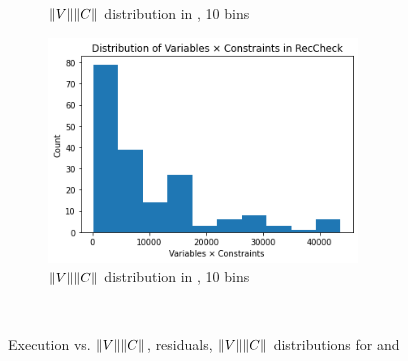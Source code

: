 \begin{figure}
\begin{subfigure}{0.475\textwidth}
\caption{$\lVert V\rVert\lVert C\rVert$ distribution in \solve, 10 bins}
\label{fig:stats:distr-solve}
\end{subfigure}
\hfill
\begin{subfigure}{0.475\textwidth}
\includegraphics[width=0.9\textwidth]{images/distribution-RecCheck.png}
\caption{$\lVert V\rVert\lVert C\rVert$ distribution in \RecCheck, 10 bins}
\label{fig:stats:distr-reccheck}
\end{subfigure}
\\[2ex]
\caption{Execution vs. $\lVert V\rVert\lVert C\rVert$, residuals, $\lVert V\rVert\lVert C\rVert$ distributions for \solve and \RecCheck}
\label{fig:stats}
\end{figure}
